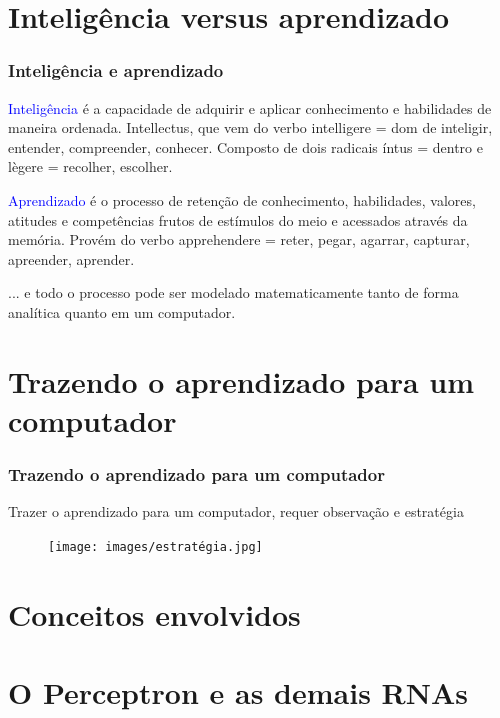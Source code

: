 \documentclass[aspectratio=169]{beamer} %
\begin{document}
\section{Inteligência versus aprendizado}

\begin{frame}
	\frametitle{Inteligência e aprendizado}
	\pause
	\begin{tcolorbox}[colback=gray!5,colframe=blue!40!black,title=Inteligência]
		\justifying
		\textcolor{blue}{Inteligência} é a capacidade de adquirir e aplicar conhecimento e habilidades de maneira ordenada. 
		Intellectus, que vem do verbo intelligere = dom de inteligir, entender, compreender, conhecer. Composto de dois radicais íntus = dentro e lègere = recolher, escolher.
    \end{tcolorbox}
\pause
	\begin{tcolorbox}[colback=gray!5,colframe=blue!40!black,title=Aprendizado]
		\justifying
		\textcolor{blue}{Aprendizado} é o processo de retenção de conhecimento, habilidades, valores, atitudes e competências frutos de estímulos do meio e acessados através da memória. 
		Provém do verbo apprehendere = reter, pegar, agarrar, capturar, apreender, aprender.
	\end{tcolorbox}
	\pause
	... e todo o processo pode ser modelado matematicamente tanto de forma analítica quanto em um computador.
\end{frame}


\section{Trazendo o aprendizado para um computador}


\begin{frame}
	\frametitle{Trazendo o aprendizado para um computador}
    \pause
	Trazer o aprendizado para um computador, requer observação e estratégia
	\begin{figure}
		\centering
		\texttt{[image: images/estratégia.jpg]} %
		\end{figure}	

\end{frame}




\section{Conceitos envolvidos}

\section{O Perceptron e as demais RNAs}
\end{document}
